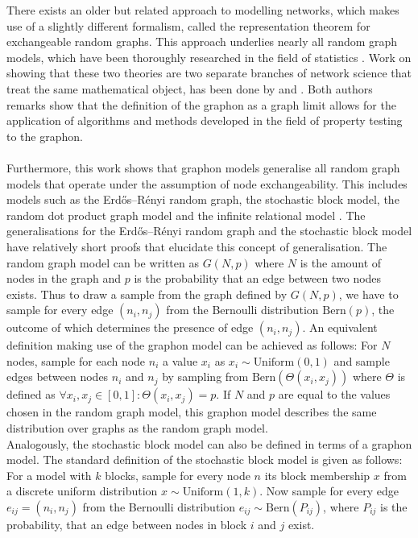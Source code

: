 \documentclass[11pt]{report} %
\begin{document}
\noindent
There exists an older but related approach to modelling networks, which makes use of a slightly different formalism, called the representation theorem for exchangeable random graphs. 
This approach underlies nearly all random graph models, which have been thoroughly researched in the field of statistics \cite{hoover1979, aldous1981, kallenberg1990}. 
Work on showing that these two theories are two separate branches of network science that treat the same mathematical object, has been done by  and . 
Both authors remarks show that the definition of the graphon as a graph limit allows for the application of algorithms and methods developed in the field of property testing to the graphon. \\\\
Furthermore, this work shows that graphon models generalise all random graph models that operate under the assumption of node exchangeability.
This includes models such as the Erd\H{o}s–Rényi random graph, the stochastic block model, the random dot product graph model and the infinite relational model \cite{Medina2020}.
The generalisations for the Erd\H{o}s–Rényi random graph and the stochastic block model have relatively short proofs that elucidate this concept of generalisation.
The random graph model can be written as $G(N,p)$ where $N$ is the amount of nodes in the graph and $p$ is the probability that an edge between two nodes exists. 
Thus to draw a sample from the graph defined by $G(N,p)$, we have to sample for every edge $(n_i, n_j)$ from the Bernoulli distribution $\text{Bern}(p)$, the outcome of which determines the presence of edge $(n_i, n_j)$. 
An equivalent definition making use of the graphon model can be achieved as follows: For $N$ nodes, sample for each node $n_i$ a value $x_i$ as $x_i\sim \text{Uniform}(0,1)$ and sample edges between nodes $n_i$ and $n_j$ by sampling from $\text{Bern}(\Theta(x_i, x_j))$ where $\Theta$ is defined as $\forall x_i,x_j \in [0,1]: \Theta(x_i, x_j)=p$. If $N$ and $p$ are equal to the values chosen in the random graph model, this graphon model describes the same distribution over graphs as the random graph model.\\
Analogously, the stochastic block model can also be defined in terms of a graphon model. 
The standard definition of the stochastic block model is given as follows: 
For a model with $k$ blocks, sample for every node $n$ its block membership $x$ from a discrete uniform distribution $x \sim \text{Uniform}(1,k)$.
Now sample for every edge $e_{ij} = (n_i, n_j)$ from the Bernoulli distribution $e_{ij} \sim \text{Bern}(P_{ij})$, where $P_{ij}$ is the probability, that an edge between nodes in block $i$ and $j$ exist.
\end{document}
